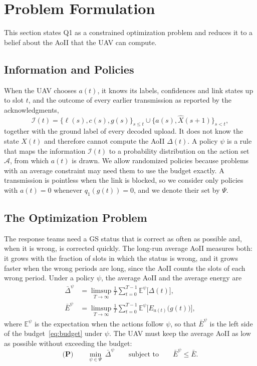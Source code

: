\documentclass[5p,twocolumn]{elsarticle}
\theoremstyle{remark}
\newcommand{\E}{\mathbb{E}}
\newcommand{\A}{\mathcal{A}}
\newcommand{\I}{\mathcal{I}}
\newcommand{\lab}{\ell}
\begin{document}
\section{Problem Formulation}\label{sec:problem}
This section states Q1 as a constrained optimization problem and reduces it to a belief about the AoII that the UAV can compute.

\subsection{Information and Policies}
When the UAV chooses $a(t)$, it knows its labels, confidences and link states up to slot $t$, and the outcome of every earlier transmission as reported by the acknowledgments,
\begin{equation}\label{eq:info}
\I(t)=\big\{\lab(s),c(s),g(s)\big\}_{s\le t}\cup\big\{a(s),\hat X(s+1)\big\}_{s<t},
\end{equation}
together with the ground label of every decoded upload.
It does not know the state $X(t)$ and therefore cannot compute the AoII $\Delta(t)$. A policy $\psi$ is a rule that maps the information $\I(t)$ to a probability distribution on the action set $\A$, from which $a(t)$ is drawn. We allow randomized policies because problems with an average constraint may need them to use the budget exactly. A transmission is pointless when the link is blocked, so we consider only policies with $a(t)=0$ whenever $q_1(g(t))=0$, and we denote their set by $\Psi$.

\subsection{The Optimization Problem}
The response teams need a GS status that is correct as often as possible and, when it is wrong, is corrected quickly. The long-run average AoII measures both: it grows with the fraction of slots in which the status is wrong, and it grows faster when the wrong periods are long, since the AoII counts the slots of each wrong period. Under a policy $\psi$, the average AoII and the average energy are
\begin{align}
\bar\Delta^{\psi}&=\limsup_{T\to\infty}\frac1T\sum_{t=0}^{T-1}\E^{\psi}\big[\Delta(t)\big],\label{eq:avgaoii}\\
\bar E^{\psi}&=\limsup_{T\to\infty}\frac1T\sum_{t=0}^{T-1}\E^{\psi}\Big[E_{a(t)}\big(g(t)\big)\Big],\label{eq:avgE}
\end{align}
where $\E^{\psi}$ is the expectation when the actions follow $\psi$, so that $\bar E^{\psi}$ is the left side of the budget~\eqref{eq:budget} under $\psi$. The UAV must keep the average AoII as low as possible without exceeding the budget:
\begin{equation}\label{eq:P}
\textbf{(P)}\qquad \min_{\psi\in\Psi}\ \bar\Delta^{\psi}\qquad\text{subject to}\qquad \bar E^{\psi}\le\bar E.
\end{equation}
\end{document}
